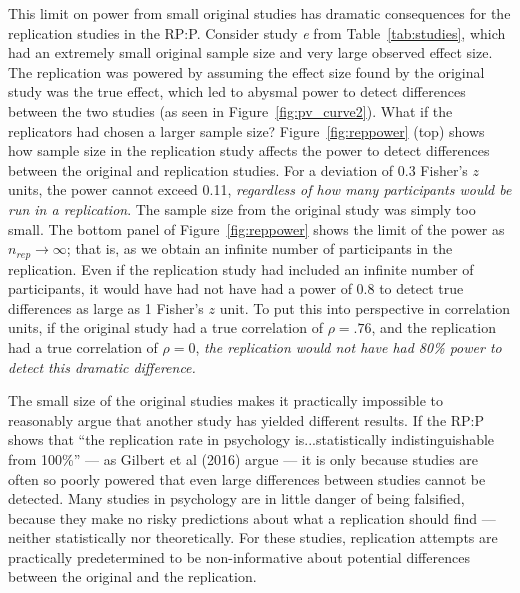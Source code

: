 \documentclass[doc,a4paper,floatsintext,draftfirst]{apa6}
\begin{document}
This limit on power from small original studies has dramatic consequences for the replication studies in the RP:P. Consider study {\em e} from Table~\ref{tab:studies}, which had an extremely small original sample size and very large observed effect size. The replication was powered by assuming the effect size found by the original study was the true effect, which led to abysmal power to detect differences between the two studies (as seen in Figure~\ref{fig:pv_curve2}). What if the replicators had chosen a larger sample size? Figure~\ref{fig:reppower} (top) shows how sample size in the replication study affects the power to detect differences between the original and replication studies. For a deviation of $0.3$ Fisher's $z$ units, the power cannot exceed 0.11, {\em regardless of how many participants would be run in a replication}. The sample size from the original study was simply too small. The bottom panel of Figure~\ref{fig:reppower} shows the limit of the power as $n_{rep}\rightarrow\infty$; that is, as we obtain an infinite number of participants in the replication. Even if the replication study had included an infinite number of participants, it would have had not have had a power of 0.8 to detect true differences as large as 1 Fisher's $z$ unit. To put this into perspective in correlation units, if the original study had a true correlation of $\rho=.76$, and the replication had a true correlation of $\rho=0$, {\em the replication would not have had 80\% power to detect this dramatic difference.}

The small size of the original studies makes it  practically impossible to reasonably argue that another study has yielded different results. If the RP:P shows that ``the replication rate in psychology is...statistically indistinguishable from 100\%'' --- as Gilbert et al (2016) argue --- it is only because studies are often so poorly powered that even large differences between studies cannot be detected. Many studies in psychology are in little danger of being falsified, because they make no risky predictions about what a replication should find --- neither statistically nor theoretically. For these studies, replication attempts are practically predetermined to be non-informative about potential differences between the original and the replication.

\nocite{Gilbert:etal:2016}
\end{document}
